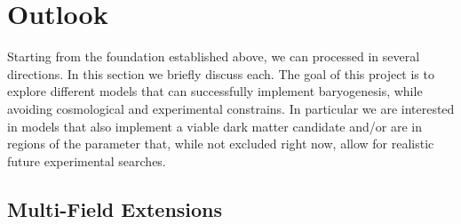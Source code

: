 \documentclass[13pt,a4paper,twoside,titlepage]{article}
\begin{document}
\section{Outlook}
\label{sec:outlook}

Starting from the foundation established above, we can processed in several directions.
In this section we briefly discuss each. The goal of this project is to explore
different models that can successfully implement baryogenesis, while avoiding cosmological and
experimental constrains.
In particular we are interested in models that also implement a viable dark matter candidate
and/or are in regions of the parameter that, while not excluded right now, allow for realistic future experimental searches.

\subsection{Multi-Field Extensions}
\label{sec:multi_fields}

\end{document}
